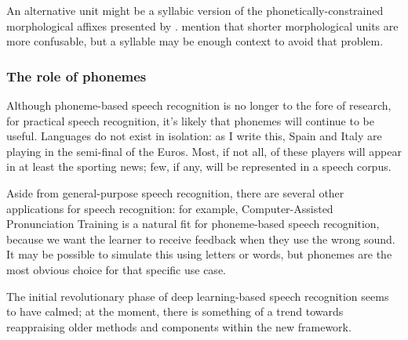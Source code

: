 \documentclass{article}[11pt]
\begin{document}
An alternative unit might be a syllabic version of the phonetically-constrained morphological affixes presented by \citet{huckvale_using_2002}. \citet{tachbelie_morpheme-based_2010} mention that shorter morphological units are more confusable, but a syllable may be enough context to avoid that problem.

\subsubsection{The role of phonemes}

Although phoneme-based speech recognition is no longer to the fore of research, for practical speech recognition, it's likely that phonemes will continue to be useful. Languages do not exist in isolation: as I write this, Spain and Italy are playing in the semi-final of the Euros. Most, if not all, of these players will appear in at least the sporting news; few, if any, will be represented in a speech corpus.

Aside from general-purpose speech recognition, there are several other applications for speech recognition: for example, Computer-Assisted Pronunciation Training is a natural fit for phoneme-based speech recognition, because we want the learner to receive feedback when they use the wrong sound. It may be possible to simulate this using letters or words, but phonemes are the most obvious choice for that specific use case.

The initial revolutionary phase of deep learning-based speech recognition seems to have calmed; at the moment, there is something of a trend towards reappraising older methods and components within the new framework. 

\citet{li_acoustic--word_2017}



%
\end{document}
